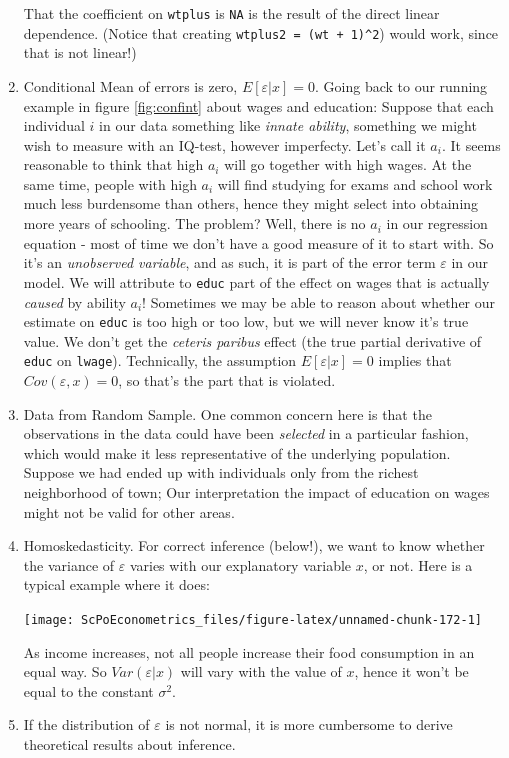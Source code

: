 \documentclass[]{book}
\begin{document}
\begin{enumerate}
  That the coefficient on \texttt{wtplus} is \texttt{NA} is the result
  of the direct linear dependence. (Notice that creating
  \texttt{wtplus2\ =\ (wt\ +\ 1)\^{}2}) would work, since that is not
  linear!)
\item
  Conditional Mean of errors is zero, \(E[\varepsilon|x] = 0\). Going
  back to our running example in figure \ref{fig:confint} about wages
  and education: Suppose that each individual \(i\) in our data
  something like \emph{innate ability}, something we might wish to
  measure with an IQ-test, however imperfecty. Let's call it \(a_i\). It
  seems reasonable to think that high \(a_i\) will go together with high
  wages. At the same time, people with high \(a_i\) will find studying
  for exams and school work much less burdensome than others, hence they
  might select into obtaining more years of schooling. The problem?
  Well, there is no \(a_i\) in our regression equation - most of time we
  don't have a good measure of it to start with. So it's an
  \emph{unobserved variable}, and as such, it is part of the error term
  \(\varepsilon\) in our model. We will attribute to \texttt{educ} part
  of the effect on wages that is actually \emph{caused} by ability
  \(a_i\)! Sometimes we may be able to reason about whether our estimate
  on \texttt{educ} is too high or too low, but we will never know it's
  true value. We don't get the \emph{ceteris paribus} effect (the true
  partial derivative of \texttt{educ} on \texttt{lwage}). Technically,
  the assumption \(E[\varepsilon|x] = 0\) implies that
  \(Cov(\varepsilon,x) = 0\), so that's the part that is violated.
\item
  Data from Random Sample. One common concern here is that the
  observations in the data could have been \emph{selected} in a
  particular fashion, which would make it less representative of the
  underlying population. Suppose we had ended up with individuals only
  from the richest neighborhood of town; Our interpretation the impact
  of education on wages might not be valid for other areas.
\item
  Homoskedasticity. For correct inference (below!), we want to know
  whether the variance of \(\varepsilon\) varies with our explanatory
  variable \(x\), or not. Here is a typical example where it does:

  \begin{center}\texttt{[image: ScPoEconometrics\_files/figure-latex/unnamed-chunk-172-1]} \end{center}

  As income increases, not all people increase their food consumption in
  an equal way. So \(Var(\varepsilon|x)\) will vary with the value of
  \(x\), hence it won't be equal to the constant \(\sigma^2\).
\item
  If the distribution of \(\varepsilon\) is not normal, it is more
  cumbersome to derive theoretical results about inference.
\end{enumerate}
\end{document}

